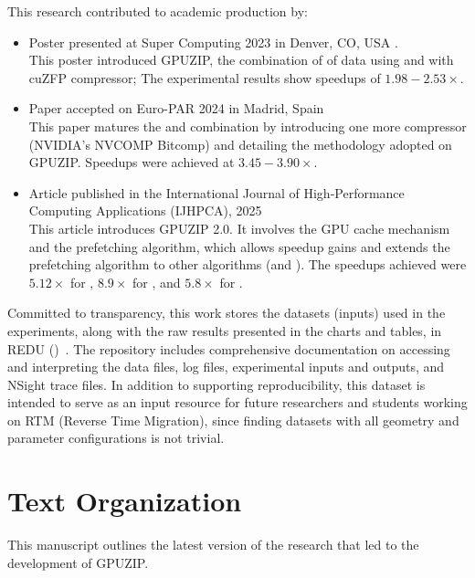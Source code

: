 \documentclass[Ingles]{ic-tese-v3}
\begin{document}
This research contributed to academic production by:
\begin{itemize}
    \item Poster presented at Super Computing 2023 in Denver, CO, USA \cite{sc23}. \\
    This poster introduced GPUZIP, the combination of \prefetching of \checkpointing data using \revolve and \compression with cuZFP compressor; The experimental results show speedups of $1.98 - 2.53\times$.
    
    \item Paper accepted on Euro-PAR 2024 in Madrid, Spain \cite{europar} \\
    This paper matures the \prefetching and \compression combination by introducing one more compressor (NVIDIA's NVCOMP Bitcomp) and detailing the methodology adopted on GPUZIP. Speedups were achieved at $3.45 - 3.90\times$.
    
    \item Article published in the International Journal of High-Performance Computing Applications (IJHPCA), 2025 \cite{ijhpca} \\
    This article introduces GPUZIP 2.0. It involves the GPU cache mechanism and the prefetching algorithm, which allows speedup gains and extends the prefetching algorithm to other \checkpointing algorithms (\zcut and \uniform). The speedups achieved were $5.12\times$ for \revolve, $8.9\times$ for \zcut, and $5.8\times$ for \uniform.
\end{itemize}

Committed to transparency, this work stores the datasets (inputs) used in the experiments, along with the raw results presented in the charts and tables, in REDU ()~\cite{ds}. The repository includes comprehensive documentation on accessing and interpreting the data files, log files, experimental inputs and outputs, and NSight trace files. In addition to supporting reproducibility, this dataset is intended to serve as an input resource for future researchers and students working on RTM (Reverse Time Migration), since finding datasets with all geometry and parameter configurations is not trivial.

\section{Text Organization}
This manuscript outlines the latest version of the research that led to the development of GPUZIP. 
\end{document}
